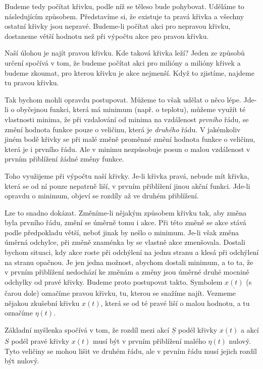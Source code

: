     Budeme tedy počítat křivku, podle níž se těleso bude pohybovat. Uděláme to následujícím
    způsobem. Představíme si, že existuje ta pravá křivka a všechny ostatní křivky jsou nepravé.
    Budeme-li počítat akci pro nepravou křivku, dostaneme větší hodnotu než při výpočtu akce pro
    pravou křivku.
    
    Naší úlohou je najít pravou křivku. Kde taková křivka leží? Jeden ze způsobů určení spočívá v
    tom, že budeme počítat akci pro milióny a milióny křivek a budeme zkoumat, pro kterou křivku je
    akce nejmenší. Když to zjistíme, najdeme tu pravou křivku.

    Tak bychom mohli opravdu postupovat. Můžeme to však udělat o něco lépe. Jde-li o obyčejnou
    funkci, která má minimum (např. o teplotu), můžeme využít té vlastnosti minima, že při
    vzdalování od minima na vzdálenost \emph{prvního} řádu, se změní hodnota funkce pouze o
    veličinu, která je \emph{druhého} řádu. V jakémkoliv jiném bodě křivky se při malé změně
    proměnné změní hodnota funkce o veličinu, která je i prvního řádu. Ale v minimu nezpůsobuje
    posun o malou vzdálenost v prvním přiblížení žádné změny funkce.

    Toho využijeme při výpočtu naší křivky. Je-li křivka pravá, nebude mít křivka, která se od ní
    pouze nepatrně liší, v prvním přiblížení jinou akční funkci. Jde-li opravdu o minimum, objeví se
    rozdíly až ve druhém přiblížení.
    
    Lze to snadno dokázat. Změníme-li nějakým způsobem křivku tak, aby změna byla prvního řádu,
    změní se úměrně tomu i akce. Při této změně se akce stává podle předpokladu větší, neboť jinak
    by nešlo o minimum. Je-li však změna úměrná odchylce, při změně znaménka by se vlastně akce
    zmenšovala. Dostali bychom situaci, kdy akce roste při odchýlení na jednu stranu a klesá při
    odchýlení na stranu opačnou. Je jen jedna možnost, abychom dostali minimum, a to ta, že v prvním
    přiblížení nedochází ke změnám a změny jsou úměrné druhé mocnině odchylky od pravé křivky.
    Budeme proto postupovat takto. Symbolem \(\underline{x(t)}\) (s čarou dole) označíme pravou
    křivku, tu, kterou se snažíme najít. Vezmeme nějakou zkušební křivku \(x(t)\), která se od té
    pravé liší o malou hodnotu, a tu označíme \(\eta(t)\).


    Základní myšlenka spočívá v tom, že rozdíl mezi akcí \(\underline{S}\) podél křivky
    \(\underline{x(t)}\) a akcí \(S\) podél pravé křivky \(x(t)\) musí být v prvním přiblížení
    malého \(\eta(t)\) nulový. Tyto veličiny se mohou lišit ve druhém řádu, ale v prvním řádu musí
    jejich rozdíl být nulový.

